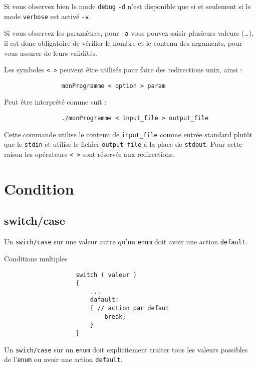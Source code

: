 		Si vous observez bien le mode \verb+debug+ \verb+-d+ n'est disponible que si et seulement si le mode \verb+verbose+ est activé \verb+-v+.

		Si vous observez les paramètres, pour \verb+-a+ vous pouvez saisir plusieurs valeurs (\dots), il est donc obligatoire de vérifier le nombre et le contenu des arguments, pour vous assurer de leurs validités.

		Les symboles \verb+< >+ peuvent être utilisés pour faire des redirections unix, ainsi :

		\begin{cbox}{}
			\begin{verbatim}
				monProgramme < option > param
			\end{verbatim}
		\end{cbox}

		Peut être interprété comme suit : 

		\begin{cbox}{}
			\begin{verbatim}
				./monProgramme < input_file > output_file
			\end{verbatim}
		\end{cbox}

		Cette commande utilise le contenu de \verb+input_file+ comme entrée standard plutôt que le \verb+stdin+ et utilise le fichier \verb+output_file+ à la place de \verb+stdout+. Pour cette raison les opérateurs \verb+< >+ sont réservés aux redirections.

	\section{Condition}
		\subsection{switch/case}
			Un \verb+swich/case+ sur une valeur autre qu'un \verb+enum+ doit avoir une action \verb+default+.

			\begin{cbox}{Conditions multiples}
				\begin{verbatim}
					switch ( valeur )
					{
					    ...
					    dafault:
					    { // action par defaut
					        break;
					    }
					}
				\end{verbatim}
			\end{cbox}

			Un \verb+swich/case+ sur un \verb+enum+ doit explicitement traiter tous les valeurs possibles de l'\verb+enum+ ou avoir une action \verb+default+.
			
